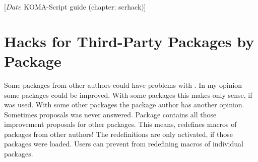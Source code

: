 %
%
%
%
%
%
%
%
% 
%
%
%
%

                 [$Date$
                  KOMA-Script guide (chapter: scrhack)]

\chapter{Hacks for Third-Party Packages by Package }

\BeginIndexGroup
{}
Some packages from other authors could have problems with \KOMAScript{}.  In my
opinion some packages could be improved. With some packages this makes only
sense, if \KOMAScript{} was used. With some other packages the package author
has another opinion. Sometimes proposals was never answered. Package
 contains all those improvement proposals for other
packages. This means,  redefines macros of packages from
other authors! The redefinitions are only activated, if those packages were
loaded. Users can prevent  from redefining macros of
individual packages.

